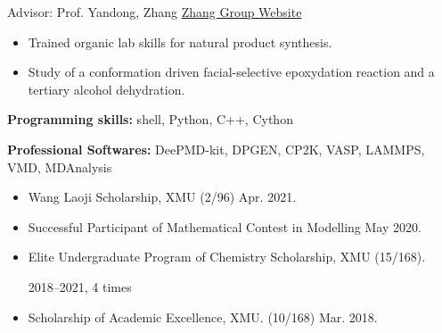{\noindent Advisor: Prof. Yandong, Zhang  \hfill \href{https://zhanglab.xmu.edu.cn/}{Zhang Group Website}}

\begin{itemize}
	\item Trained organic lab skills for natural product synthesis.
	\item Study of a conformation driven facial-selective epoxydation reaction and a tertiary alcohol dehydration.
\end{itemize}


\vspace{5mm}

\sectionrule
{\noindent \textbf{Programming skills:} }{shell, Python, C++, Cython}

{\noindent \textbf{Professional Softwares: }{DeePMD-kit, DPGEN, CP2K, VASP, LAMMPS, VMD, MDAnalysis}}

\clearpage
{}
\sectionrule

\begin{itemize}
	\item Wang Laoji Scholarship, XMU (2/96) \hfill Apr. 2021.
	\item Successful Participant of Mathematical Contest in Modelling \hfill May 2020.
	\item Elite Undergraduate Program of Chemistry Scholarship, XMU (15/168).

	      \hspace*{\fill}2018--2021, 4 times
	\item Scholarship of Academic Excellence, XMU. (10/168) \hfill Mar. 2018.
\end{itemize}

\vspace{5mm}

\sectionrule
\nocite{*} %
\printbibliography[heading=none] %
